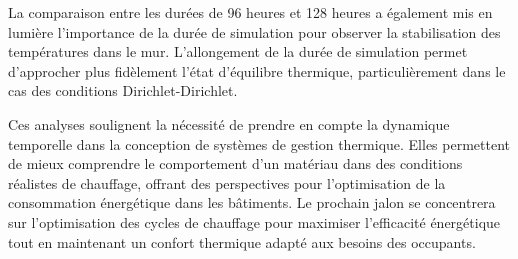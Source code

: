 \documentclass[a4paper,11pt]{article}
\begin{document}
La comparaison entre les durées de 96 heures et 128 heures a également mis en lumière l'importance de la durée de simulation pour observer la stabilisation des températures dans le mur. L'allongement de la durée de simulation permet d'approcher plus fidèlement l'état d'équilibre thermique, particulièrement dans le cas des conditions Dirichlet-Dirichlet.

Ces analyses soulignent la nécessité de prendre en compte la dynamique temporelle dans la conception de systèmes de gestion thermique. Elles permettent de mieux comprendre le comportement d'un matériau dans des conditions réalistes de chauffage, offrant des perspectives pour l'optimisation de la consommation énergétique dans les bâtiments. Le prochain jalon se concentrera sur l'optimisation des cycles de chauffage pour maximiser l'efficacité énergétique tout en maintenant un confort thermique adapté aux besoins des occupants.
\end{document}

